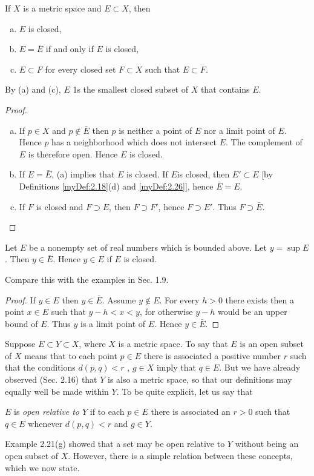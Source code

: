 \begin{thm}
    \label{thm:2.27}
    If $X$ is a metric space and $E \subset X$, then
    \begin{enumerate}[(a)]
        \item $E$ is closed,
        \item $E = \bar{E}$ if and only if $E$ is closed,
        \item $E \subset F$ for every closed set $F \subset X$ such that $E \subset F$.
    \end{enumerate}
\end{thm}
By (a) and (c), $E$ 1s the smallest closed subset of $X$ that contains $E$.
\begin{proof}
    \begin{enumerate}[(a)]
        \item If $p \in X$ and $p \not\in \bar{E}$ then $p$ is neither a point of $E$ nor a limit point of $E$. Hence $p$ has a neighborhood which does not intersect $E$. The complement of $E$ is therefore open. Hence $E$ is closed.
        \item If $E = \bar{E}$, (a) implies that $E$ is closed. If $E$is closed, then $E' \subset E$ [by Definitions \ref{myDef:2.18}(d) and \ref{myDef:2.26}], hence $\bar{E} = E$.
        \item If $F$ is closed and $F \supset E$, then $F \supset F'$, hence $F \supset E'$. Thus $F \supset \bar{E}$.
    \end{enumerate}
\end{proof}


\begin{thm}
    \label{thm:2.28}
    Let $E$ be a nonempty set of real numbers which is bounded above.     Let $y = \sup E$. Then $y \in \bar{E}$. Hence $y \in E$ if $E$ is closed.
\end{thm}
Compare this with the examples in Sec. 1.9.
\begin{proof}
    If $y \in E$ then $y \in \bar{E}$. 
    Assume $y \not\in E$. 
    For every $h > 0$ there exists then a point $x \in E$ 
    such that $y - h < x < y$, 
    for otherwise $y - h$ would be an upper bound of $E$. 
    Thus $y$ is a limit point of $E$. Hence $y \in \bar{E}$.
\end{proof}

\begin{myRemark}
    Suppose $E \subset Y \subset X$, where $X$ is a metric space. To say that $E$ is an open subset of $X$ means that to each point $p \in E$ there is associated a positive number $r$ such that the conditions $d(p,q) < r$ , $g \in X$ imply that $q \in E$. But we have already observed (Sec. 2.16) that $Y$ is also a metric space, so that our definitions may equally well be made within $Y$. To be quite explicit, let us say that 
    
    $E$ is \emph{open relative to $Y$} if to each $p \in E$ there is associated an $r > 0$ such that $q \in E$ whenever $d(p,q) <r$ and $g \in Y$. 
    
    Example 2.21(g) showed that a set may be open relative to $Y$ without being an open subset of $X$. However, there is a simple relation between these concepts, which we now state.
\end{myRemark}

